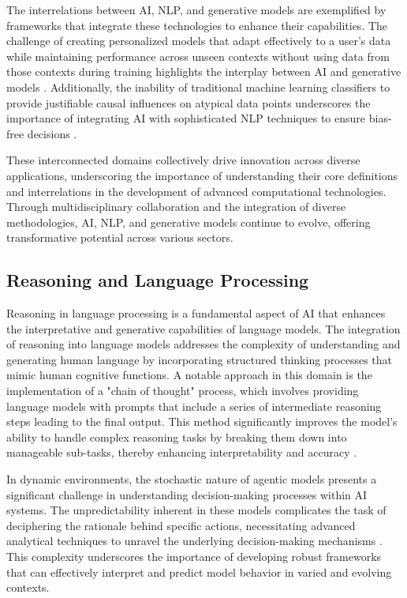 The interrelations between AI, NLP, and generative models are exemplified by frameworks that integrate these technologies to enhance their capabilities. The challenge of creating personalized models that adapt effectively to a user's data while maintaining performance across unseen contexts without using data from those contexts during training highlights the interplay between AI and generative models \cite{kaur2024cropcontextwiserobuststatic}. Additionally, the inability of traditional machine learning classifiers to provide justifiable causal influences on atypical data points underscores the importance of integrating AI with sophisticated NLP techniques to ensure bias-free decisions \cite{sen2018supervisingfeatureinfluence}.

These interconnected domains collectively drive innovation across diverse applications, underscoring the importance of understanding their core definitions and interrelations in the development of advanced computational technologies. Through multidisciplinary collaboration and the integration of diverse methodologies, AI, NLP, and generative models continue to evolve, offering transformative potential across various sectors.


\subsection{Reasoning and Language Processing} \label{subsec:Reasoning and Language Processing}



Reasoning in language processing is a fundamental aspect of AI that enhances the interpretative and generative capabilities of language models. The integration of reasoning into language models addresses the complexity of understanding and generating human language by incorporating structured thinking processes that mimic human cognitive functions. A notable approach in this domain is the implementation of a "chain of thought" process, which involves providing language models with prompts that include a series of intermediate reasoning steps leading to the final output. This method significantly improves the model's ability to handle complex reasoning tasks by breaking them down into manageable sub-tasks, thereby enhancing interpretability and accuracy \cite{wei2022chain}.



In dynamic environments, the stochastic nature of agentic models presents a significant challenge in understanding decision-making processes within AI systems. The unpredictability inherent in these models complicates the task of deciphering the rationale behind specific actions, necessitating advanced analytical techniques to unravel the underlying decision-making mechanisms \cite{jucys2024interpretabilityactionexploratoryanalysis}. This complexity underscores the importance of developing robust frameworks that can effectively interpret and predict model behavior in varied and evolving contexts.



